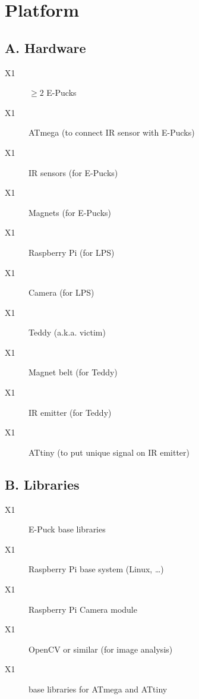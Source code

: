 \documentclass[a4paper,parskip,headheight=38pt]{scrartcl} %
\begin{document}
\section{Platform}

\subsection*{A. Hardware}
\begin{description}
\item[X1] $\ge 2$ E-Pucks
\item[X1] ATmega (to connect IR sensor with E-Pucks)
\item[X1] IR sensors (for E-Pucks)
\item[X1] Magnets (for E-Pucks)
\item[X1] Raspberry Pi (for LPS)
\item[X1] Camera (for LPS)
\item[X1] Teddy (a.k.a. victim)
\item[X1] Magnet belt (for Teddy)
\item[X1] IR emitter (for Teddy)
\item[X1] ATtiny (to put unique signal on IR emitter)
\end{description}

\subsection*{B. Libraries}
\begin{description}
\item[X1] E-Puck base libraries
\item[X1] Raspberry Pi base system (Linux, \ldots)
\item[X1] Raspberry Pi Camera module
\item[X1] OpenCV or similar (for image analysis)
\item[X1] base libraries for ATmega and ATtiny
\end{description}
\end{document}
